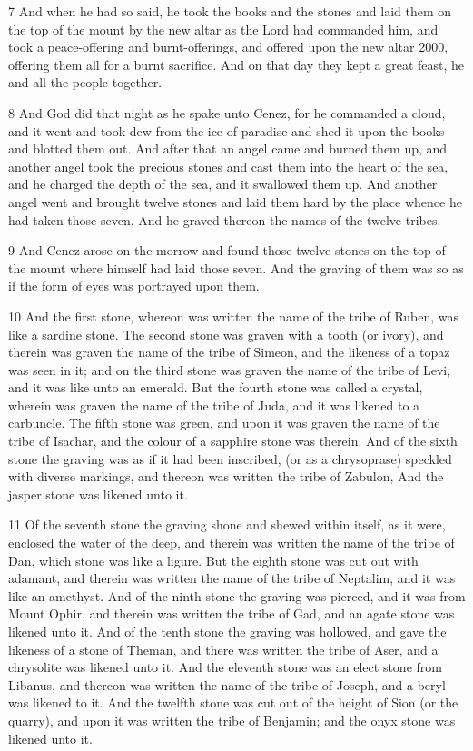 \par 7 And when he had so said, he took the books and the stones and laid them on the top of the mount by the new altar as the Lord had commanded him, and took a peace-offering and burnt-offerings, and offered upon the new altar 2000, offering them all for a burnt sacrifice. And on that day they kept a great feast, he and all the people together. 

\par 8 And God did that night as he spake unto Cenez, for he commanded a cloud, and it went and took dew from the ice of paradise and shed it upon the books and blotted them out. And after that an angel came and burned them up, and another angel took the precious stones and cast them into the heart of the sea, and he charged the depth of the sea, and it swallowed them up. And another angel went and brought twelve stones and laid them hard by the place whence he had taken those seven. And he graved thereon the names of the twelve tribes.

\par 9 And Cenez arose on the morrow and found those twelve stones on the top of the mount where himself had laid those seven. And the graving of them was so as if the form of eyes was portrayed upon them.

\par 10 And the first stone, whereon was written the name of the tribe of Ruben, was like a sardine stone. The second stone was graven with a tooth (or ivory), and therein was graven the name of the tribe of Simeon, and the likeness of a topaz was seen in it; and on the third stone was graven the name of the tribe of Levi, and it was like unto an emerald. But the fourth stone was called a crystal, wherein was graven the name of the tribe of Juda, and it was likened to a carbuncle. The fifth stone was green, and upon it was graven the name of the tribe of Isachar, and the colour of a sapphire stone was therein. And of the sixth stone the graving was as if it had been inscribed, (or as a chrysoprase) speckled with diverse markings, and thereon was written the tribe of Zabulon, And the jasper stone was likened unto it.

\par 11 Of the seventh stone the graving shone and shewed within itself, as it were, enclosed the water of the deep, and therein was written the name of the tribe of Dan, which stone was like a ligure. But the eighth stone was cut out with adamant, and therein was written the name of the tribe of Neptalim, and it was like an amethyst. And of the ninth stone the graving was pierced, and it was from Mount Ophir, and therein was written the tribe of Gad, and an agate stone was likened unto it. And of the tenth stone the graving was hollowed, and gave the likeness of a stone of Theman, and there was written the tribe of Aser, and a chrysolite was likened unto it. And the eleventh stone was an elect stone from Libanus, and thereon was written the name of the tribe of Joseph, and a beryl was likened to it. And the twelfth stone was cut out of the height of Sion (or the quarry), and upon it was written the tribe of Benjamin; and the onyx stone was likened unto it.

